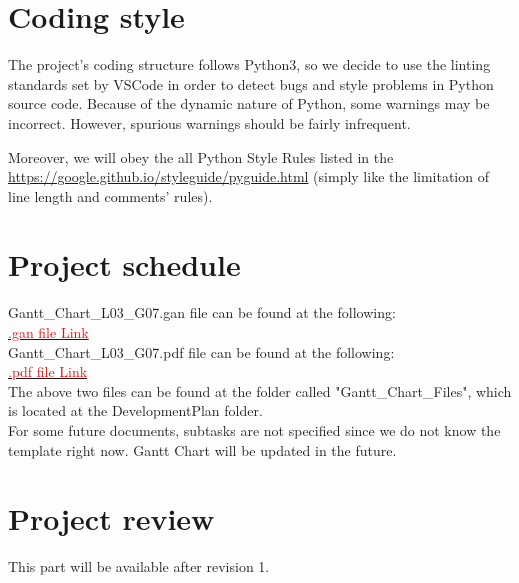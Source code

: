\documentclass[12pt]{article}
\begin{document}
\section{Coding style}
The project’s coding structure follows Python3, so we decide to use the linting standards set by VSCode in order to detect bugs and style problems in Python source code. Because of the dynamic nature of Python, some warnings may be incorrect. However, spurious warnings should be fairly infrequent. 

\noindent Moreover, we will obey the all Python Style Rules listed in the \url{https://google.github.io/styleguide/pyguide.html} (simply like the limitation of line length and comments’ rules).

\section{Project schedule}
Gantt\_Chart\_L03\_G07.gan file can be found at the following:\\ 
\href{https://gitlab.cas.mcmaster.ca/shit19/2022_winter_3xa3_l03_g07/-/blob/main/ProjectSchedule/Gantt_Chart_L03_G07.gan}{\textcolor{red}{.gan file Link}}\\

\noindent Gantt\_Chart\_L03\_G07.pdf file can be found at the following:\\ \href{https://gitlab.cas.mcmaster.ca/shit19/2022_winter_3xa3_l03_g07/-/blob/main/ProjectSchedule/Gantt_Chart_L03_G07.pdf}{\textcolor{red}{.pdf file Link}}\\

\noindent The above two files can be found at 
the folder called "Gantt\_Chart\_Files", which
is located at the DevelopmentPlan folder.\\
For some future documents, subtasks are not 
specified since we do not know the template 
right now. Gantt Chart will be updated in the 
future.  
\section{Project review}
This part will be available after revision 1.
\end{document}
